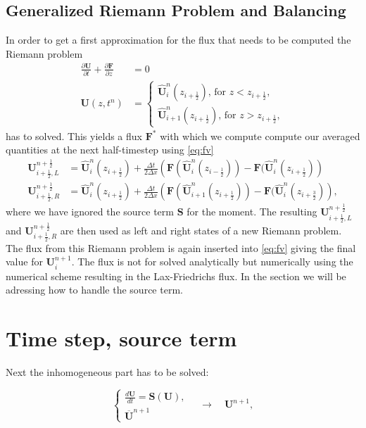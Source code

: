 \documentclass[a4paper, oneside]{discothesis}
\begin{document}
\subsection{Generalized Riemann Problem and Balancing} \label{ssec:grp}
In order to get a first approximation for the flux that needs to be computed the Riemann problem
\begin{align}
	\frac{\partial \mathbf{U}}{\partial t} + \frac{\partial \mathbf{F}}{\partial z} &= 0 \\
	\mathbf{U}(z,t^n) &= \left\{
		\begin{array}{c}
			\mathbf{\hat{U}}_i^n(z_{i+\frac{1}{2}}) \text{, for } z < z_{i+\frac{1}{2}}, \\
			\mathbf{\hat{U}}_{i+1}^n(z_{i+\frac{1}{2}}) \text{, for } z > z_{i+\frac{1}{2}},
	\end{array} \right.  
\end{align}
has to solved.
This yields a flux $\mathbf{F^*}$ with which we compute compute our averaged quantities at the next half-timestep using \autoref{eq:fv}
\begin{align}
	\mathbf{U}_{i+\frac{1}{2},L}^{n+\frac{1}{2}} &= \mathbf{\hat{U}}_i^n(z_{i+\frac{1}{2}}) + \frac{\Delta t}{2 \Delta x} \left( \mathbf{F}(\mathbf{\hat{U}}_i^n( z_{i-\frac{1}{2}})) - \mathbf{F}(\mathbf{\hat{U}}_i^n(z_{i+\frac{1}{2}}) \right)\\
	\mathbf{U}_{i+\frac{1}{2},R}^{n+\frac{1}{2}} &= \mathbf{\hat{U}}_i^n(z_{i+\frac{1}{2}}) + \frac{\Delta t}{2 \Delta x} \left( \mathbf{F}(\mathbf{\hat{U}}_{i+1}^n( z_{i+\frac{1}{2}})) - \mathbf{F}(\mathbf{\hat{U}}_i^n(z_{i+\frac{3}{2}}) \right),
\end{align}
where we have ignored the source term $\mathbf{S}$ for the moment.
The resulting $\mathbf{U}_{i+\frac{1}{2},L}^{n+\frac{1}{2}}$ and $\mathbf{U}_{i+\frac{1}{2},R}^{n+\frac{1}{2}}$ are then used as left and right states of a new Riemann problem.
The flux from this Riemann problem is again inserted into \autoref{eq:fv} giving the final value for $\mathbf{U}_i^{n+1}$.
The flux is not for solved analytically but numerically using the numerical scheme resulting in the Lax-Friedrichs flux.
In the section we will be adressing how to handle the source term.

\section{Time step, source term}
Next the inhomogeneous part has to be solved:

\begin{equation}
	\left\{\begin{array}{l}
			\frac{d \mathbf{U}}{d t}=\mathbf{S}(\mathbf{U}), \\
			\overline{\mathbf{U}}^{n+1}
	\end{array} \quad \rightarrow \quad \mathbf{U}^{n+1},\right.
\end{equation}
\end{document}
